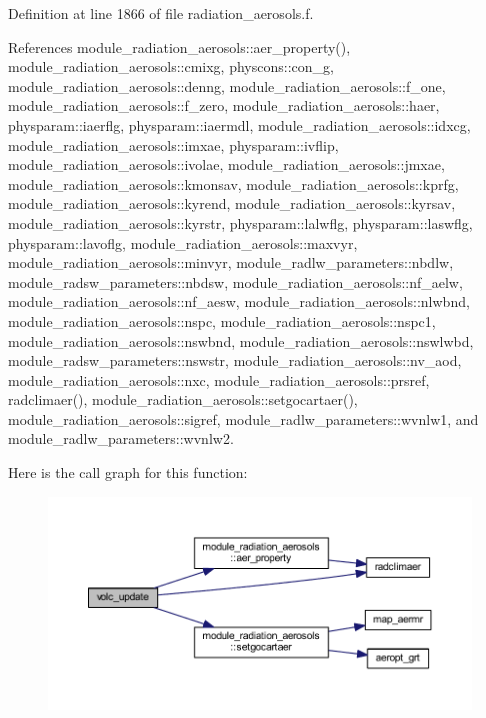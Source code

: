 Definition at line 1866 of file radiation\+\_\+aerosols.\+f.



References module\+\_\+radiation\+\_\+aerosols\+::aer\+\_\+property(), module\+\_\+radiation\+\_\+aerosols\+::cmixg, physcons\+::con\+\_\+g, module\+\_\+radiation\+\_\+aerosols\+::denng, module\+\_\+radiation\+\_\+aerosols\+::f\+\_\+one, module\+\_\+radiation\+\_\+aerosols\+::f\+\_\+zero, module\+\_\+radiation\+\_\+aerosols\+::haer, physparam\+::iaerflg, physparam\+::iaermdl, module\+\_\+radiation\+\_\+aerosols\+::idxcg, module\+\_\+radiation\+\_\+aerosols\+::imxae, physparam\+::ivflip, module\+\_\+radiation\+\_\+aerosols\+::ivolae, module\+\_\+radiation\+\_\+aerosols\+::jmxae, module\+\_\+radiation\+\_\+aerosols\+::kmonsav, module\+\_\+radiation\+\_\+aerosols\+::kprfg, module\+\_\+radiation\+\_\+aerosols\+::kyrend, module\+\_\+radiation\+\_\+aerosols\+::kyrsav, module\+\_\+radiation\+\_\+aerosols\+::kyrstr, physparam\+::lalwflg, physparam\+::laswflg, physparam\+::lavoflg, module\+\_\+radiation\+\_\+aerosols\+::maxvyr, module\+\_\+radiation\+\_\+aerosols\+::minvyr, module\+\_\+radlw\+\_\+parameters\+::nbdlw, module\+\_\+radsw\+\_\+parameters\+::nbdsw, module\+\_\+radiation\+\_\+aerosols\+::nf\+\_\+aelw, module\+\_\+radiation\+\_\+aerosols\+::nf\+\_\+aesw, module\+\_\+radiation\+\_\+aerosols\+::nlwbnd, module\+\_\+radiation\+\_\+aerosols\+::nspc, module\+\_\+radiation\+\_\+aerosols\+::nspc1, module\+\_\+radiation\+\_\+aerosols\+::nswbnd, module\+\_\+radiation\+\_\+aerosols\+::nswlwbd, module\+\_\+radsw\+\_\+parameters\+::nswstr, module\+\_\+radiation\+\_\+aerosols\+::nv\+\_\+aod, module\+\_\+radiation\+\_\+aerosols\+::nxc, module\+\_\+radiation\+\_\+aerosols\+::prsref, radclimaer(), module\+\_\+radiation\+\_\+aerosols\+::setgocartaer(), module\+\_\+radiation\+\_\+aerosols\+::sigref, module\+\_\+radlw\+\_\+parameters\+::wvnlw1, and module\+\_\+radlw\+\_\+parameters\+::wvnlw2.



Here is the call graph for this function\+:
\nopagebreak
\begin{figure}[H]
\begin{center}
\leavevmode
\includegraphics[width=350pt]{zhang__orig_2radiation__aerosols_8f_a6ec9bd68d45a5f2c6bb9997bdad420c3_cgraph}
\end{center}
\end{figure}


